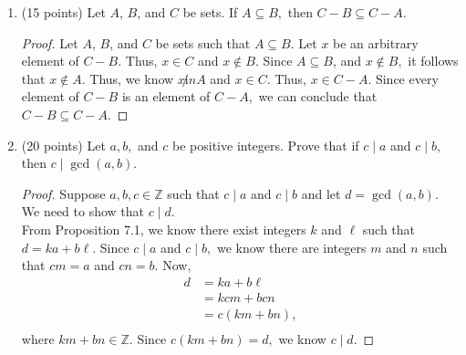 \documentclass[11pt]{article}
\newcommand{\Z}{{\mathbb{Z}}}
\begin{document}
\begin{enumerate}
\begin{proof}
\end{proof}

\item (15 points) Let $A$, $B$, and $C$ be sets. If $A \subseteq B,$ then $C-B \subseteq C-A.$

\begin{proof} Let $A$, $B$, and $C$ be sets such that $A \subseteq B.$ Let $x $ be an arbitrary element of $C-B.$ Thus, $x \in C$ and $x \not \in{B}.$ Since $A \subseteq B$, and $x \not \in B, $ it follows that $x \not \in A.$ Thus, we know $x \not in A$ and $x \in C.$ Thus, $x \in C-A.$ Since every element of $C-B$ is an element of $C-A,$ we can conclude that $C-B \subseteq C-A.$

\end{proof}

\item (20 points) Let $a,b,$ and $c$ be positive integers. Prove that if $c \mid a$ and $c \mid b,$ then $c \mid \gcd(a,b).$

\begin{proof} Suppose $a,b,c \in \Z$ such that $c \mid a$ and $c \mid b$ and let $d = \gcd(a,b).$ We need to show that $c \mid d.$\\ 
From Proposition 7.1, we know there exist integers $k$ and $\ell$ such that $d=ka+b\ell.$ Since $c \mid a$ and $c \mid b,$ we know there are integers $m$ and $n$ such that $cm=a$ and $cn=b.$ Now, 
\begin{align*}
d &= ka+b\ell \\ 
&= kcm+bcn\\
&=c(km+bn), \\
\end{align*}
where $km+bn\in \Z.$ Since $c(km+bn)=d,$ we know $c \mid d.$\end{proof}
\newpage
\end{enumerate}
\end{document}
